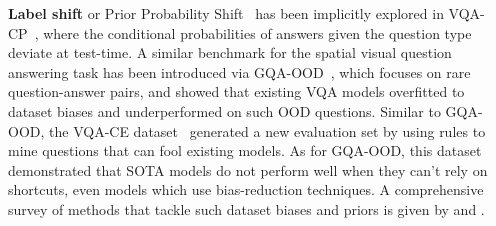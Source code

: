 \textbf{Label shift} or Prior Probability Shift~\citep{storkey2009training} has been implicitly explored in VQA-CP~\citep{agrawal2018don}, where the conditional probabilities of answers given the question type deviate at test-time.
A similar benchmark for the spatial visual question answering task has been introduced via GQA-OOD~\citep{kervadec2020roses}, which focuses on rare question-answer pairs, and showed that existing VQA models overfitted to dataset biases and underperformed on such OOD questions. 
Similar to GQA-OOD, the VQA-CE dataset~\citep{dancette2021beyond} generated a new evaluation set by using rules to mine questions that can fool existing models.
As for GQA-OOD, this dataset demonstrated that SOTA
models do not perform well when they can’t rely on shortcuts, even models which use bias-reduction
techniques. 
A comprehensive survey of methods that tackle such dataset biases and priors is given by \citet{shrestha2022investigation} and \citet{teney2020value}.






